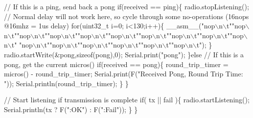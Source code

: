 \begin{DoxyCodeInclude}
    \textcolor{comment}{// If this is a ping, send back a pong}
    \textcolor{keywordflow}{if}(received == ping)\{
      radio.stopListening();
      \textcolor{comment}{// Normal delay will not work here, so cycle through some no-operations (16nops @16mhz = 1us delay)}
      \textcolor{keywordflow}{for}(uint32\_t i=0; i<130;i++)\{
         \_\_asm\_\_(\textcolor{stringliteral}{"nop\(\backslash\)n\(\backslash\)t"}\textcolor{stringliteral}{"nop\(\backslash\)n\(\backslash\)t"}\textcolor{stringliteral}{"nop\(\backslash\)n\(\backslash\)t"}\textcolor{stringliteral}{"nop\(\backslash\)n\(\backslash\)t"}\textcolor{stringliteral}{"nop\(\backslash\)n\(\backslash\)t"}\textcolor{stringliteral}{"nop\(\backslash\)n\(\backslash\)t"}\textcolor{stringliteral}{"nop\(\backslash\)n\(\backslash\)t"}\textcolor{stringliteral}{"nop\(\backslash\)n\(\backslash\)t"}\textcolor{stringliteral}{"nop\(\backslash\)n\(\backslash\)t"}\textcolor{stringliteral}{"nop\(\backslash\)n\(\backslash\)t"}\textcolor{stringliteral}{
      "nop\(\backslash\)n\(\backslash\)t"}\textcolor{stringliteral}{"nop\(\backslash\)n\(\backslash\)t"}\textcolor{stringliteral}{"nop\(\backslash\)n\(\backslash\)t"}\textcolor{stringliteral}{"nop\(\backslash\)n\(\backslash\)t"}\textcolor{stringliteral}{"nop\(\backslash\)n\(\backslash\)t"}\textcolor{stringliteral}{"nop\(\backslash\)n\(\backslash\)t"});
      \}
      radio.startWrite(&pong,\textcolor{keyword}{sizeof}(pong),0);
      Serial.print(\textcolor{stringliteral}{"pong"});
    \}\textcolor{keywordflow}{else}    
    \textcolor{comment}{// If this is a pong, get the current micros()}
    \textcolor{keywordflow}{if}(received == pong)\{
      round\_trip\_timer = micros() - round\_trip\_timer;
      Serial.print(F(\textcolor{stringliteral}{"Received Pong, Round Trip Time: "}));
      Serial.println(round\_trip\_timer);
    \}
  \}

  \textcolor{comment}{// Start listening if transmission is complete}
  \textcolor{keywordflow}{if}( tx || fail )\{
     radio.startListening(); 
     Serial.println(tx ? F(\textcolor{stringliteral}{":OK"}) : F(\textcolor{stringliteral}{":Fail"}));
  \}  
\}
\end{DoxyCodeInclude}
 